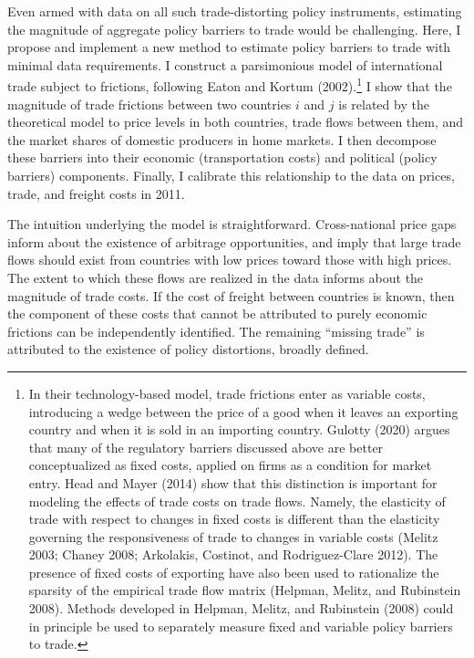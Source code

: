 \documentclass{puthesis}
\begin{document}
Even armed with data on all such trade-distorting policy instruments,
estimating the magnitude of aggregate policy barriers to trade would be
challenging. Here, I propose and implement a new method to estimate
policy barriers to trade with minimal data requirements. I construct a
parsimonious model of international trade subject to frictions,
following Eaton and Kortum (2002).\footnote{In their technology-based
  model, trade frictions enter as variable costs, introducing a wedge
  between the price of a good when it leaves an exporting country and
  when it is sold in an importing country. Gulotty (2020) argues that
  many of the regulatory barriers discussed above are better
  conceptualized as fixed costs, applied on firms as a condition for
  market entry. Head and Mayer (2014) show that this distinction is
  important for modeling the effects of trade costs on trade flows.
  Namely, the elasticity of trade with respect to changes in fixed costs
  is different than the elasticity governing the responsiveness of trade
  to changes in variable costs (Melitz 2003; Chaney 2008; Arkolakis,
  Costinot, and Rodriguez-Clare 2012). The presence of fixed costs of
  exporting have also been used to rationalize the sparsity of the
  empirical trade flow matrix (Helpman, Melitz, and Rubinstein 2008).
  Methods developed in Helpman, Melitz, and Rubinstein (2008) could in
  principle be used to separately measure fixed and variable policy
  barriers to trade.} I show that the magnitude of trade frictions
between two countries \(i\) and \(j\) is related by the theoretical
model to price levels in both countries, trade flows between them, and
the market shares of domestic producers in home markets. I then
decompose these barriers into their economic (transportation costs) and
political (policy barriers) components. Finally, I calibrate this
relationship to the data on prices, trade, and freight costs in 2011.

The intuition underlying the model is straightforward. Cross-national
price gaps inform about the existence of arbitrage opportunities, and
imply that large trade flows should exist from countries with low prices
toward those with high prices. The extent to which these flows are
realized in the data informs about the magnitude of trade costs. If the
cost of freight between countries is known, then the component of these
costs that cannot be attributed to purely economic frictions can be
independently identified. The remaining ``missing trade'' is attributed
to the existence of policy distortions, broadly defined.
\end{document}
